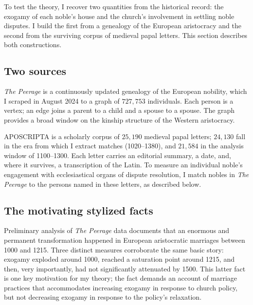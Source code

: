 \documentclass[12pt]{article}
\theoremstyle{definition}
\theoremstyle{remark}
\begin{document}
To test the theory, I recover two quantities from the historical record: the exogamy of each noble's house and the church's involvement in settling noble disputes. I build the first from a genealogy of the European aristocracy and the second from the surviving corpus of medieval papal letters. This section describes both constructions.

\subsection{Two sources}

\emph{The Peerage} \citep{lundy_2024} is a continuously updated genealogy of the European nobility, which I scraped in August 2024 to a graph of $727{,}753$ individuals. Each person is a vertex; an edge joins a parent to a child and a spouse to a spouse. The graph provides a broad window on the kinship structure of the Western aristocracy.

APOSCRIPTA is a scholarly corpus of $25{,}190$ medieval papal letters; $24{,}130$ fall in the era from which I extract matches (1020--1380), and $21{,}584$ in the analysis window of 1100--1300. Each letter carries an editorial summary, a date, and, where it survives, a transcription of the Latin. To measure an individual noble's engagement with ecclesiastical organs of dispute resolution, I match nobles in \emph{The Peerage} to the persons named in these letters, as described below.

\subsection{The motivating stylized facts}
\label{sub:facts}
Preliminary analysis of \textit{The Peerage} data documents that an enormous and permanent transformation happened in European aristocratic marriages between 1000 and 1215. Three distinct measures corroborate the same basic story: exogamy exploded around 1000, reached a saturation point around 1215, and then, very importantly, had not significantly attenuated by 1500. This latter fact is one key motivation for my theory; the fact demands an account of marriage practices that accommodates increasing exogamy in response to church policy, but not decreasing exogamy in response to the policy's relaxation.
\end{document}
